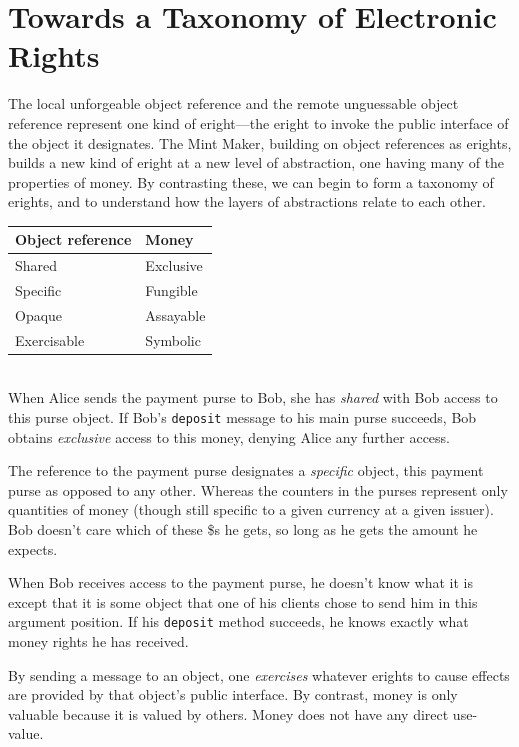 \documentclass{llncs}
\begin{document}

\section{Towards a Taxonomy of Electronic Rights}

The local unforgeable object reference and the remote unguessable object reference represent one kind of eright---the eright to invoke the public interface of the object it designates. The Mint Maker, building on object references as erights, builds a new kind of eright at a new level of abstraction, one having many of the properties of money. By contrasting these, we can begin to form a taxonomy of erights, and to understand how the layers of abstractions relate to each other. 

\begin{tabular}{ l l }
  Object reference & Money \\ \hline
  Shared & Exclusive \\
  Specific & Fungible \\
  Opaque & Assayable \\
  Exercisable & Symbolic \\
\end{tabular}\\

When Alice sends the payment purse to Bob, she has \emph{shared} with Bob access to this purse object. If Bob's {\tt deposit} message to his main purse succeeds, Bob obtains \emph{exclusive} access to this money, denying Alice any further access.

The reference to the payment purse designates a \emph{specific} object, this payment purse as opposed to any other. Whereas the counters in the purses represent only quantities of money (though still specific to a given currency at a given issuer). Bob doesn't care which of these \$s he gets, so long as he gets the amount he expects.

When Bob receives access to the payment purse, he doesn't know what it is except that it is some object that one of his clients chose to send him in this argument position. If his {\tt deposit} method succeeds, he knows exactly what money rights he has received.

By sending a message to an object, one \emph{exercises} whatever erights to cause effects are provided by that object's public interface. By contrast, money is only valuable because it is valued by others. Money does not have any direct use-value.
\end{document}
